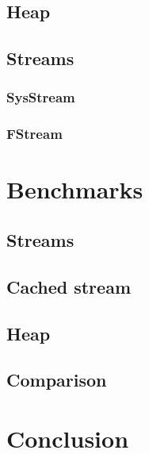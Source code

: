\documentclass[a4paper,12pt]{article}
\begin{document}
\subsection{Heap}

\subsection{Streams}

\subsubsection{SysStream}

\subsubsection{FStream}

\section{Benchmarks}

\subsection{Streams}


\subsection{Cached stream}

\subsection{Heap}


\subsection{Comparison}

\section{Conclusion}


\clearpage{}
\end{document}
